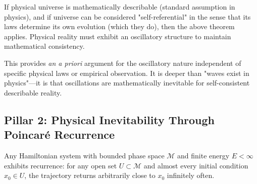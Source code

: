 \documentclass[11pt,onecolumn]{article}
\begin{document}
If physical universe is mathematically describable (standard assumption in physics), and if universe can be considered "self-referential" in the sense that its laws determine its own evolution (which they do), then the above theorem applies. Physical reality must exhibit an oscillatory structure to maintain mathematical consistency.

This provides \textit{an a priori} argument for the oscillatory nature independent of specific physical laws or empirical observation. It is deeper than "waves exist in physics"---it is that oscillations are mathematically inevitable for self-consistent describable reality.

\subsection{Pillar 2: Physical Inevitability Through Poincar\'e Recurrence}

\begin{theorem}
\label{thm:poincare_oscillation}
Any Hamiltonian system with bounded phase space $\mathcal{M}$ and finite energy $E < \infty$ exhibits recurrence: for any open set $U \subset \mathcal{M}$ and almost every initial condition $x_0 \in U$, the trajectory returns arbitrarily close to $x_0$ infinitely often.
\end{theorem}
\end{document}

